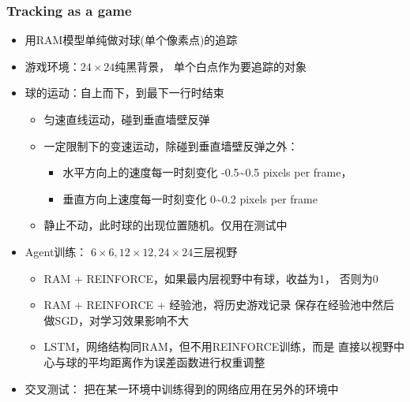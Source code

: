 \documentclass[10pt,CJK]{beamer}
\begin{document}
	\begin{frame}
		\frametitle{Tracking as a game}
		\begin{itemize}
			\item 用RAM模型单纯做对球(单个像素点)的追踪\pause
			\item 游戏环境：$24\times 24$纯黑背景，
			单个白点作为要追踪的对象\pause
			\item 球的运动：自上而下，到最下一行时结束
			\begin{itemize}
				\item 匀速直线运动，碰到垂直墙壁反弹
				\item 一定限制下的变速运动，除碰到垂直墙壁反弹之外：
				\begin{itemize}
					\item 水平方向上的速度每一时刻变化
					-0.5\textasciitilde0.5 pixels per frame，
					\item 垂直方向上速度每一时刻变化
					0\textasciitilde0.2 pixels per frame
				\end{itemize}
				\item 静止不动，此时球的出现位置随机。仅用在测试中
			\end{itemize}\pause
			\item Agent训练：
			$6\times 6,12\times 12,24\times 24$三层视野
			\begin{itemize}
				\item RAM + REINFORCE，如果最内层视野中有球，收益为1，
				否则为0
				\item RAM + REINFORCE + 经验池，将历史游戏记录
				保存在经验池中然后做SGD，对学习效果影响不大
				\item LSTM，网络结构同RAM，但不用REINFORCE训练，而是
				直接以视野中心与球的平均距离作为误差函数进行权重调整
			\end{itemize}\pause
			\item 交叉测试：
			把在某一环境中训练得到的网络应用在另外的环境中
		\end{itemize}
	\end{frame}
	
\end{document}
